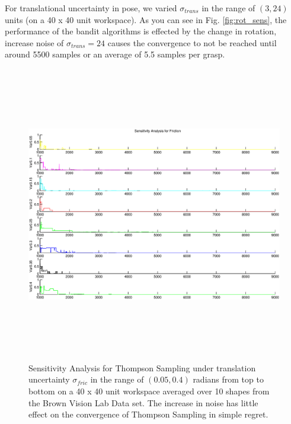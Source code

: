 \documentclass[journal,transmag]{IEEEtran}%
\begin{document}
For translational uncertainty in pose, we varied $\sigma_{trans}$ in the range of $(3, 24)$ units (on a 40 x 40 unit workspace). As you can see in Fig. \ref{fig:rot_sens}, the performance of the bandit algorithms is effected by the change in rotation, increase noise of $\sigma_{trans} = 24$ causes the convergence to not be reached until around 5500 samples or an average of 5.5 samples per grasp. 


\begin{figure}[ht!]
\centering
\includegraphics[width = 16.5cm, height = 13cm]{matlab_figures/sensitivity_fric.eps}
\caption{ \footnotesize Sensitivity Analysis for Thompson Sampling under translation uncertainty $\sigma_{fric}$ in the range of $(0.05, 0.4)$ radians from top to bottom on a 40 x 40 unit workspace averaged over 10 shapes from the Brown Vision Lab Data set. The increase in noise has little effect on the convergence of Thompson Sampling in simple regret.}
\vspace*{-10pt}
\label{fig:fric_sens}
\end{figure}
\end{document}
